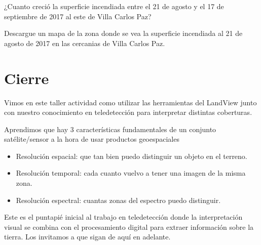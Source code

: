 \documentclass[a4paper,12pt]{book}
\begin{document}
\begin{que}
    ¿Cuanto creció la superficie incendiada entre el 21 de agosto y el 17 de septiembre de 2017 al este de Villa Carlos Paz?
\end{que}

\begin{que}
    Descargue un mapa de la zona donde se vea la superficie incendiada al 21 de agosto de 2017 en las cercanias de Villa Carlos Paz.
\end{que}

\chapter{Cierre}

Vimos en este taller actividad como utilizar las herramientas del LandView junto con nuestro conocimiento en teledetección para interpretar distintas coberturas.

Aprendimos que hay 3 características fundamentales de un conjunto satélite/sensor a la hora de usar productos geoespaciales

\begin{itemize}
    \item Resolución espacial: que tan bien puedo distinguir un objeto en el terreno.
    \item Resolución temporal: cada cuanto vuelvo a tener una imagen de la misma zona.
    \item Resolución espectral: cuantas zonas del espectro puedo distinguir.
\end{itemize}

Este es el puntapié inicial al trabajo en teledetección donde la interpretación visual se combina con el procesamiento digital para extraer información sobre la tierra. Los invitamos a que sigan de aquí en adelante.
\end{document}
